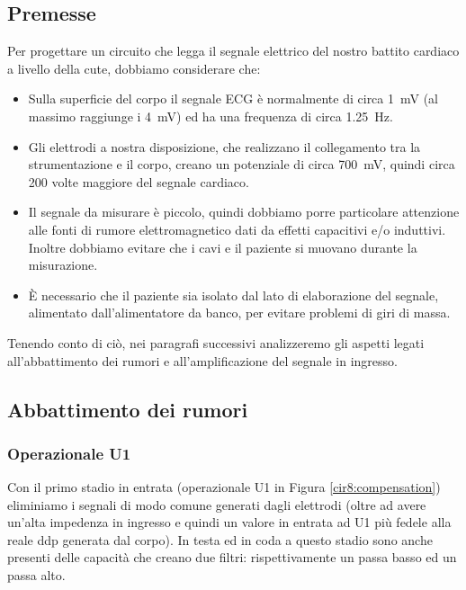 \subsection{Premesse}

Per progettare un circuito che legga il segnale elettrico del nostro battito cardiaco a livello della cute, dobbiamo considerare che:
\begin{itemize} [noitemsep]
	\item Sulla superficie del corpo il segnale ECG è normalmente di circa \SI{1}{mV} (al massimo raggiunge i \SI{4}{mV}) ed ha una frequenza di circa \SI{1.25}{\Hz}.
	\item Gli elettrodi a nostra disposizione, che realizzano il collegamento tra la strumentazione e il corpo, creano un potenziale di circa \SI{700}{\mV}, quindi circa \num{200} volte maggiore del segnale cardiaco.
	\item Il segnale da misurare è piccolo, quindi dobbiamo porre particolare attenzione alle fonti di rumore elettromagnetico dati da effetti capacitivi e/o induttivi. Inoltre dobbiamo evitare che i cavi e il paziente si muovano durante la misurazione.
	\item È necessario che il paziente sia isolato dal lato di elaborazione del segnale, alimentato dall'alimentatore da banco, per evitare problemi di giri di massa.
\end{itemize}

Tenendo conto di ciò, nei paragrafi successivi analizzeremo gli aspetti legati all'abbattimento dei rumori e all'amplificazione del segnale in ingresso.

\subsection{Abbattimento dei rumori}

\subsubsection*{Operazionale U1}

Con il primo stadio in entrata (operazionale U1 in Figura \ref{cir8:compensation}) eliminiamo i segnali di modo comune generati dagli elettrodi (oltre ad avere un'alta impedenza in ingresso e quindi un valore in entrata ad U1 più fedele alla reale ddp generata dal corpo). In testa ed in coda a questo stadio sono anche presenti delle capacità che creano due filtri: rispettivamente un passa basso ed un passa alto.

